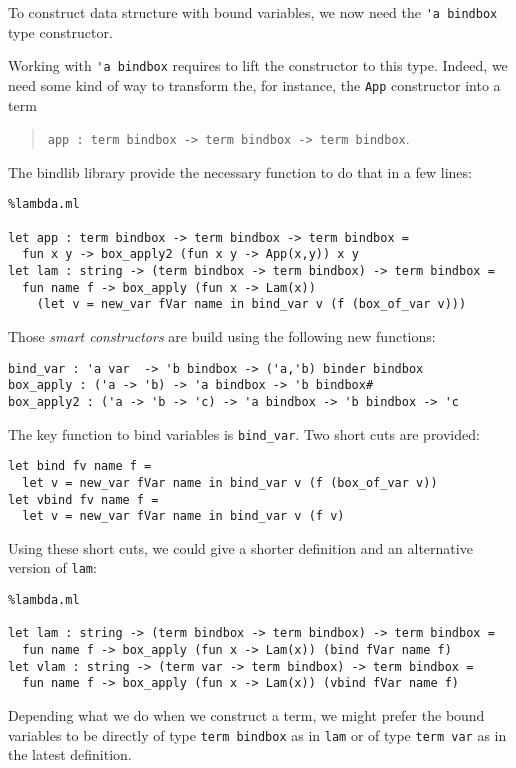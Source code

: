 \documentclass[11pt]{article}
\begin{document}
To construct data structure with bound variables, we now need the
\verb!'a bindbox! type constructor.

Working with \verb!'a bindbox! requires to lift the constructor to
this type. Indeed, we need some kind of way to transform the, for instance,
the \verb!App! constructor into a term
\begin{quote}
  \verb!app : term bindbox -> term bindbox -> term bindbox!.
\end{quote}
The bindlib library
provide the necessary function to do that in a few lines:

\begin{lstlisting}%lambda.ml

let app : term bindbox -> term bindbox -> term bindbox =
  fun x y -> box_apply2 (fun x y -> App(x,y)) x y
let lam : string -> (term bindbox -> term bindbox) -> term bindbox =
  fun name f -> box_apply (fun x -> Lam(x))
    (let v = new_var fVar name in bind_var v (f (box_of_var v)))
\end{lstlisting}

Those \emph{smart constructors} are build using the following new functions:
\begin{lstlisting}
bind_var : 'a var  -> 'b bindbox -> ('a,'b) binder bindbox
box_apply : ('a -> 'b) -> 'a bindbox -> 'b bindbox#
box_apply2 : ('a -> 'b -> 'c) -> 'a bindbox -> 'b bindbox -> 'c
\end{lstlisting}

The key function to bind variables is \verb#bind_var#. Two short cuts
are provided:
\begin{lstlisting}
let bind fv name f =
  let v = new_var fVar name in bind_var v (f (box_of_var v))
let vbind fv name f =
  let v = new_var fVar name in bind_var v (f v)
\end{lstlisting}

Using these short cuts, we could give a shorter definition and an
alternative version of \verb#lam#:

\begin{lstlisting}%lambda.ml

let lam : string -> (term bindbox -> term bindbox) -> term bindbox =
  fun name f -> box_apply (fun x -> Lam(x)) (bind fVar name f)
let vlam : string -> (term var -> term bindbox) -> term bindbox =
  fun name f -> box_apply (fun x -> Lam(x)) (vbind fVar name f)
\end{lstlisting}

Depending what we do when we construct a term, we might prefer
the bound variables to be directly of type \verb#term bindbox# as in
\verb#lam# or of type \verb#term var# as in the latest definition.
\end{document}
